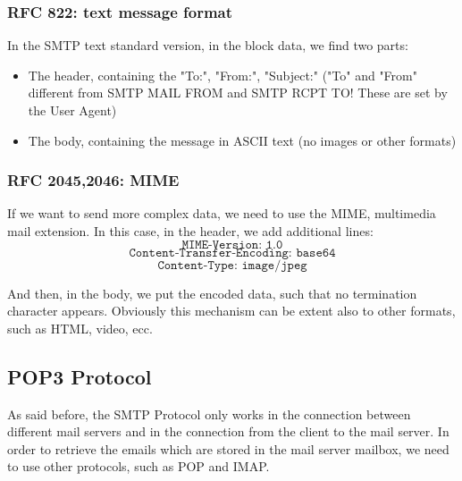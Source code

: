 \subsubsection{RFC 822: text message format}
In the SMTP text standard version, in the block data, we find two parts:
\begin{itemize}
    \item The header, containing the "To:", "From:", "Subject:" ("To" and "From" different from SMTP MAIL FROM and SMTP RCPT TO! These are set by the User Agent)
    \item The body, containing the message in ASCII text (no images or other formats)
\end{itemize}

\subsubsection{RFC 2045,2046: MIME}
If we want to send more complex data, we need to use the MIME, multimedia mail extension. In this case, in the header, we add additional lines:
\[\texttt{MIME-Version: 1.0}\]
\[\texttt{Content-Transfer-Encoding: base64}\]
\[\texttt{Content-Type: image/jpeg}\]

\noindent And then, in the body, we put the encoded data, such that no termination character appears. Obviously this mechanism can be extent also to other formats, such as HTML, video, ecc.

\subsection{POP3 Protocol}
As said before, the SMTP Protocol only works in the connection between different mail servers and in the connection from the client to the mail server. In order to retrieve the emails which are stored in the mail server mailbox, we need to use other protocols, such as POP and IMAP.

